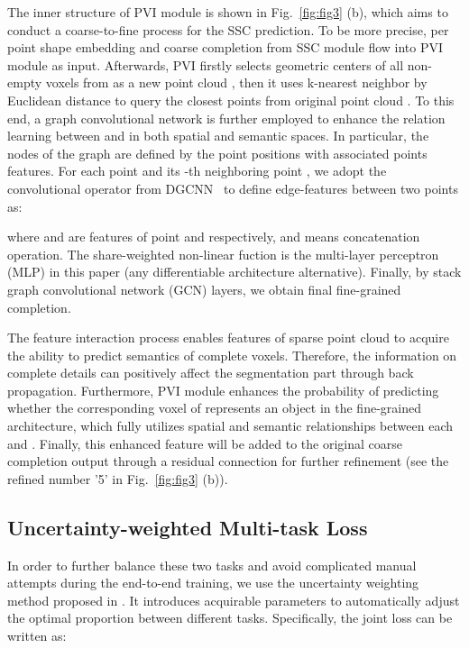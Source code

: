 \documentclass[letterpaper]{article} \usepackage{aaai21}  \usepackage{times}  \usepackage{helvet} \usepackage{courier}  \usepackage[hyphens]{url}  \usepackage{graphicx} \urlstyle{rm} \def\UrlFont{\rm}  \usepackage{natbib}  \usepackage{booktabs}
\begin{document}
	The inner structure of PVI module is shown in Fig.~\ref{fig:fig3} (b), which aims to conduct a coarse-to-fine process for the SSC prediction.
To be more precise, per point shape embedding  and coarse completion from SSC module  flow into PVI module as input.
Afterwards, PVI firstly selects geometric centers of all non-empty voxels from  as a new point cloud , then it uses k-nearest neighbor by Euclidean distance to query the closest points from original point cloud . 
To this end, a graph convolutional network is further employed to enhance the relation learning between  and  in both spatial and semantic spaces. 
In particular, the nodes of the graph are defined by the point positions with associated points features.
For each point  and its -th neighboring point , we adopt the convolutional operator from DGCNN~\cite{DGCNN} to define edge-features  between two points as:
	
	where  and  are features of point  and  respectively, and  means concatenation operation.
The share-weighted non-linear fuction  is the multi-layer perceptron (MLP) in this paper (any differentiable architecture alternative).
Finally, by stack  graph convolutional network (GCN) layers, we obtain final fine-grained completion.

    The feature interaction process enables features of sparse point cloud to acquire the ability to predict semantics of complete voxels. 
Therefore, the information on complete details can positively affect the segmentation part through back propagation.
Furthermore, PVI module enhances the probability of predicting whether the corresponding voxel of  represents an object in the fine-grained architecture, which fully utilizes spatial and semantic relationships between each  and . 
Finally, this enhanced feature will be added to the original coarse completion output through a residual connection for further refinement (see the refined number '5' in Fig.~\ref{fig:fig3} (b)).

	\subsection{Uncertainty-weighted Multi-task Loss}
	In order to further balance these two tasks and avoid complicated manual attempts during the end-to-end training, we use the uncertainty weighting method proposed in \cite{kendall2018multi}. It introduces acquirable parameters to automatically adjust the optimal proportion between different tasks. Specifically, the joint loss can be written as:
	
\end{document}
